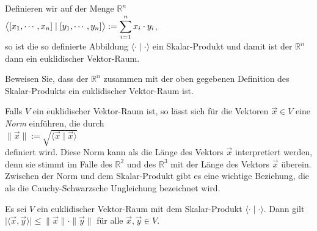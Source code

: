 \example
Definieren wir auf der Menge $\mathbb{R}^n$ 
\\[0.2cm]
\hspace*{1.3cm}
$\displaystyle\bigl\langle [x_1, \cdots, x_n] \mid [y_1, \cdots, y_n] \bigr\rangle := \sum\limits_{i=1}^n x_i \cdot y_i$,
\\[0.2cm]
so ist die so definierte Abbildung $\langle \cdot \mid \cdot \rangle$ ein Skalar-Produkt und damit
ist der $\mathbb{R}^n$ dann ein euklidischer Vektor-Raum.  \eox

\exercise
Beweisen Sie, dass der $\mathbb{R}^n$ zusammen mit der oben gegebenen Definition des Skalar-Produkts
ein euklidischer Vektor-Raum ist.  \eox


Falls $V$ ein euklidischer Vektor-Raum ist, so l\"{a}sst sich f\"{u}r die Vektoren $\vec{x} \in V$ eine \emph{Norm}
einf\"{u}hren, die durch
\\[0.2cm]
\hspace*{1.3cm}
$\|\vec{x}\| := \sqrt{\langle \vec{x} \mid \vec{x} \rangle}$
\\[0.2cm]
definiert wird.  Diese Norm kann als die L\"{a}nge des Vektors $\vec{x}$ interpretiert werden, denn sie
stimmt im Falle des $\mathbb{R}^2$ und des $\mathbb{R}^3$ mit der L\"{a}nge des Vektors $\vec{x}$
\"{u}berein.  Zwischen der Norm und dem Skalar-Produkt gibt es eine wichtige Beziehung, die als die
Cauchy-Schwarzsche Ungleichung bezeichnet wird.

\begin{Satz} \lb
  Es sei $V$ ein euklidischer Vektor-Raum mit dem Skalar-Produkt $\langle \cdot \mid \cdot \rangle$.
  Dann gilt
  \\[0.2cm]
  \hspace*{1.3cm}
  $\bigl|\langle \vec{x}, \vec{y} \rangle\bigr| \leq \| \vec{x} \| \cdot \|\vec{y}\|$ 
  \quad f\"{u}r alle $\vec{x}, \vec{y} \in V$.
\end{Satz}


